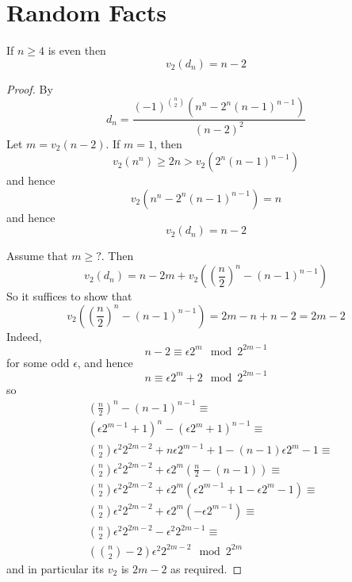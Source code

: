 \documentclass[../main.tex]{subfiles}
\begin{document}
\section{Random Facts}
\begin{lemma}
  If $n \geq 4$ is even then 
\[
  v_2\left( d_n \right) = n - 2
\]
\end{lemma}
\begin{proof}
  By \cite{MARTIN2004213} 
  \[
    d_n = \frac{
      \left( -1 \right)^{\binom{n}{2}}\left( n^n - 2^n \left( n - 1 \right)^{ n - 1 } \right)
    }{
      \left( n - 2 \right)^2
    }
  \]
  Let $m = v_2\left( n - 2 \right)$.
  If $m = 1$, then 
  \[
    v_2\left( n^n \right) \geq 2n > v_2\left( 2^n \left(  n - 1 \right)^{ n - 1 } \right)
  \]
  and hence 
  \[
    v_2\left( n^n - 2^n \left( n - 1 \right)^{ n - 1 } \right) = n 
  \]
  and hence 
\[
  v_2\left( d_n \right) = n - 2
\]

Assume that $m \geq ?$.
Then 
\[
  v_2\left( d_n \right) = n - 2m + v_2\left( \left( \frac{n}{2} \right)^n - \left( n - 1 \right)^{ n - 1 } \right)
\]
So it suffices to show that 
\[
  v_2\left( \left( \frac{n}{2} \right)^n - \left( n - 1 \right)^{ n - 1 } \right) = 
  2m - n + n - 2 = 2m - 2
\]
Indeed,
\[
  n - 2 \equiv \epsilon 2^m \mod 2^{2m-1}
\]
for some odd $\epsilon$, and hence 
\[
  n \equiv \epsilon 2^m + 2 \mod 2^{2m-1}
\]
so 
\begin{align*}
  & \left( \frac{n}{2} \right)^n - \left( n - 1 \right)^{n - 1} \equiv \\
  & \left( \epsilon 2^{m - 1} + 1 \right)^n - \left( \epsilon 2^m + 1 \right)^{ n - 1 } \equiv \\
  & \binom{n}{2} \epsilon^2 2^{2m - 2} + n\epsilon 2^{m - 1} + 1 - \left( n - 1 \right) \epsilon 2^m - 1 \equiv \\ 
  & \binom{n}{2} \epsilon^2 2^{2m - 2} + 
  \epsilon 2^m \left(  
  \frac{n}{2} - \left( n - 1 \right)
  \right) \equiv \\ 
  & \binom{n}{2} \epsilon^2 2^{2m - 2} + 
  \epsilon 2^m \left(  
    \epsilon 2^{m - 1} + 1 - \epsilon 2^m - 1
  \right) \equiv \\
  & \binom{n}{2} \epsilon^2 2^{2m - 2} + \epsilon 2^m \left( -\epsilon 2^{m-1} \right) \equiv \\
  & \binom{n}{2} \epsilon^2 2^{2m - 2} - \epsilon^2 2^{2m - 1} \equiv \\
  & \left( \binom{n}{2} - 2 \right) \epsilon^2 2^{2m - 2} \mod 2^{2m}
\end{align*}
and in particular its $v_2$ is $2m - 2$ as required.
\end{proof}
\end{document}
